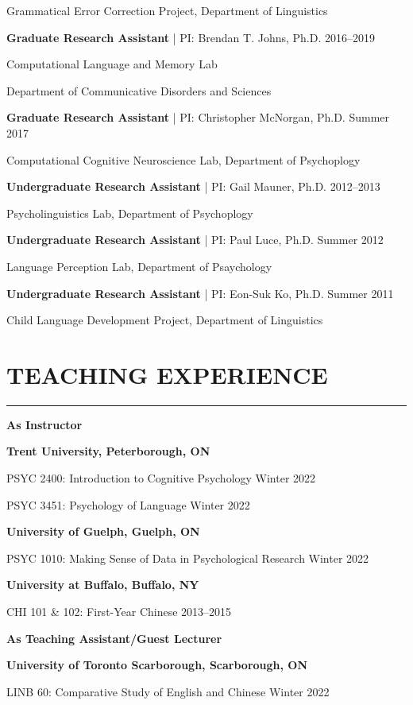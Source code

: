 \documentclass[11pt]{article}
\newcommand{\cvsection}[1]{\vspace{-0.2cm}\section*{\Large #1}\vspace{-0.2cm}\hrule\vspace{0.2cm}}
\newcommand{\h}[1]{\hspace{15pt} #1}
\begin{document}
\h{Grammatical Error Correction Project, Department of Linguistics}

\textbf{Graduate Research Assistant} | PI: Brendan T. Johns, Ph.D. \hfill 2016--2019

\h{Computational Language and Memory Lab}

\h{Department of Communicative Disorders and Sciences}

\textbf{Graduate Research Assistant} | PI: Christopher McNorgan, Ph.D. \hfill Summer 2017

\h{Computational Cognitive Neuroscience Lab, Department of Psychoplogy}

\textbf{Undergraduate Research Assistant} | PI: Gail Mauner, Ph.D. \hfill 2012--2013

\h{Psycholinguistics Lab, Department of Psychoplogy}

\textbf{Undergraduate Research Assistant} | PI: Paul Luce, Ph.D. \hfill Summer 2012

\h{Language Perception Lab, Department of Psaychology}

\textbf{Undergraduate Research Assistant} | PI: Eon-Suk Ko, Ph.D. \hfill Summer 2011

\h{Child Language Development Project, Department of Linguistics}



\cvsection{TEACHING EXPERIENCE}

\textbf{\large As Instructor}

\textbf{Trent University, Peterborough, ON}

\h{PSYC 2400: Introduction to Cognitive Psychology} \hfill Winter 2022

\h{PSYC 3451: Psychology of Language} \hfill Winter 2022

\pagebreak

\textbf{University of Guelph, Guelph, ON}

\h{PSYC 1010: Making Sense of Data in Psychological Research} \hfill Winter 2022

\textbf{University at Buffalo, Buffalo, NY}

\h{CHI 101 \& 102: First-Year Chinese} \hfill 2013--2015

\bigskip 

\textbf{\large As Teaching Assistant/Guest Lecturer}

\textbf{University of Toronto Scarborough, Scarborough, ON}

\h{LINB 60: Comparative Study of English and Chinese} \hfill Winter 2022
\end{document}
